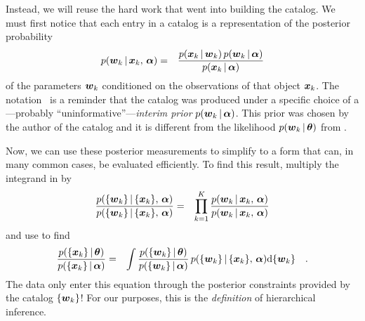 Instead, we will reuse the hard work that went into building the catalog.
We must first notice that each entry in a catalog is a representation of the
posterior probability
\begin{eqnarray}\eqlabel{crazypost}
p(\entry_k\,|\,\data_k,\,\interim) &=&
\frac{p(\data_k\,|\,\entry_k)\,p(\entry_k\,|\,\interim)}
     {p(\data_k\,|\,\interim)}
\end{eqnarray}
of the parameters ${{\boldsymbol{w}}}_k$ conditioned on the observations of that object
${{\boldsymbol{x}}}_k$.
The notation \interim\ is a reminder that the catalog was produced under a
specific choice of a---probably ``uninformative''---\emph{interim prior}
$p({{\boldsymbol{w}}}_k\,|\,{{\boldsymbol{\alpha}}})$.
This prior was chosen by the author of the catalog and it is different from
the likelihood $p({{\boldsymbol{w}}}_k\,|\,{{\boldsymbol{{\theta}}}})$ from .

Now, we can use these posterior measurements to simplify  to a
form that can, in many common cases, be evaluated efficiently.
To find this result, multiply the integrand in  by
\begin{eqnarray}
\frac{p(\{{{\boldsymbol{w}}}_k\}\,|\,\{{{\boldsymbol{x}}}_k\},\,{{\boldsymbol{\alpha}}})}
     {p(\{{{\boldsymbol{w}}}_k\}\,|\,\{{{\boldsymbol{x}}}_k\},\,{{\boldsymbol{\alpha}}})} &=&
\prod_{k=1}^K
\frac{p({{\boldsymbol{w}}}_k\,|\,{{\boldsymbol{x}}}_k,\,{{\boldsymbol{\alpha}}})}
     {p({{\boldsymbol{w}}}_k\,|\,{{\boldsymbol{x}}}_k,\,{{\boldsymbol{\alpha}}})}
\end{eqnarray}
and use  to find
\begin{eqnarray}\eqlabel{simplemarglike}
\frac{p(\{\data_k\}\,|\,\ratepars)}{p(\{\data_k\}\,|\,\interim)} &=&
    \int
    \frac{p(\{\entry_k\}\,|\,\ratepars)}{p(\{\entry_k\}\,|\,\interim)}\,
    p(\{\entry_k\}\,|\,\{\data_k\},\,\interim)
    \dd\{\entry_k\} \quad.
\end{eqnarray}
The data only enter this equation through the posterior constraints provided
by the catalog $\{{{\boldsymbol{w}}}_k\}$!
For our purposes, this is the \emph{definition} of hierarchical inference.

